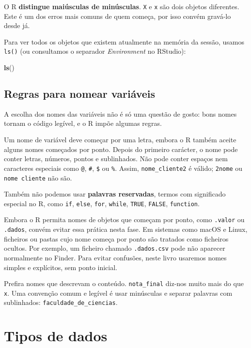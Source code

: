 \documentclass[
  portuguese,
  11pt,
  openany]{book}
\newenvironment{Shaded}{\begin{snugshade}}{\end{snugshade}}
\newcommand{\FunctionTok}[1]{\textcolor[rgb]{0.13,0.29,0.53}{\textbf{#1}}}
\newcommand{\NormalTok}[1]{#1}
\begin{document}
O R \textbf{distingue maiúsculas de minúsculas}. \texttt{X} e \texttt{x} são dois objetos
diferentes. Este é um dos erros mais comuns de quem começa, por isso convém
gravá-lo desde já.

Para ver todos os objetos que existem atualmente na memória da sessão, usamos \texttt{ls()} (ou consultamos o separador \emph{Environment} no RStudio):

\begin{Shaded}
\begin{Highlighting}[]
\FunctionTok{ls}\NormalTok{()}
\end{Highlighting}
\end{Shaded}

\subsection{Regras para nomear variáveis}\label{regras-para-nomear-variuxe1veis}

A escolha dos nomes das variáveis não é só uma questão de gosto: bons nomes tornam o código legível, e o R impõe algumas regras.

Um nome de variável deve começar por uma letra, embora o R também aceite alguns nomes começados por ponto. Depois do primeiro carácter, o nome pode conter letras, números, pontos e sublinhados. Não pode conter espaços nem caracteres especiais como \texttt{@}, \texttt{\#}, \texttt{\$} ou \texttt{\%}. Assim, \texttt{nome\_cliente2} é válido; \texttt{2nome} ou \texttt{nome\ cliente} não são.

Também não podemos usar \textbf{palavras reservadas}, termos com significado especial no R, como \texttt{if}, \texttt{else}, \texttt{for}, \texttt{while}, \texttt{TRUE}, \texttt{FALSE}, \texttt{function}.

Embora o R permita nomes de objetos que começam por ponto, como \texttt{.valor} ou \texttt{.dados}, convém evitar essa prática nesta fase. Em sistemas como macOS e Linux, ficheiros ou pastas cujo nome começa por ponto são tratados como ficheiros ocultos. Por exemplo, um ficheiro chamado \texttt{.dados.csv} pode não aparecer normalmente no Finder. Para evitar confusões, neste livro usaremos nomes simples e explícitos, sem ponto inicial.

Prefira nomes que descrevam o conteúdo. \texttt{nota\_final} diz-nos muito mais do que \texttt{x}. Uma convenção comum e legível é usar minúsculas e separar palavras com sublinhados: \texttt{faculdade\_de\_ciencias}.

\section{Tipos de dados}\label{tipos-de-dados}
\end{document}
